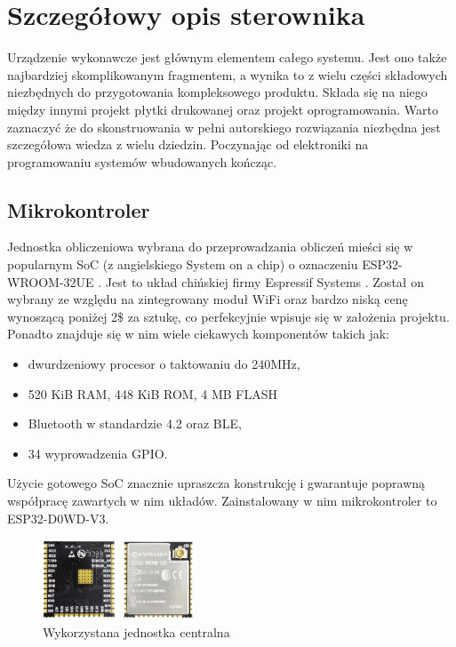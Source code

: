 
    \chapter{Szczegółowy opis sterownika}
        Urządzenie wykonawcze jest głównym elementem całego systemu. Jest ono także najbardziej skomplikowanym fragmentem, a wynika to z wielu części składowych niezbędnych do przygotowania kompleksowego produktu. Składa się na niego między innymi projekt płytki drukowanej oraz projekt oprogramowania. Warto zaznaczyć że do skonstruowania w pełni autorskiego rozwiązania niezbędna jest szczegółowa wiedza z wielu dziedzin. Poczynając od elektroniki na programowaniu systemów wbudowanych kończąc.
    
    
        \section{Mikrokontroler}
            Jednostka obliczeniowa wybrana do przeprowadzania obliczeń mieści się w popularnym SoC (z angielskiego System on a chip) o oznaczeniu ESP32-WROOM-32UE \cite{esp_module}. Jest to układ chińskiej firmy Espressif Systems \cite{espressif}. Został on wybrany ze względu na zintegrowany moduł WiFi oraz bardzo niską cenę wynoszącą poniżej 2\$ za sztukę, co perfekcyjnie wpisuje się w założenia projektu. Ponadto znajduje się w nim wiele ciekawych komponentów takich jak:
    
            \begin{itemize}
              \item dwurdzeniowy procesor o taktowaniu do 240MHz,
              \item 520 KiB RAM, 448 KiB ROM, 4 MB FLASH
              \item Bluetooth w standardzie 4.2 oraz BLE,
              \item 34 wyprowadzenia GPIO.
            \end{itemize}
            
            Użycie gotowego SoC znacznie upraszcza konstrukcję i gwarantuje poprawną współpracę zawartych w nim układów. Zainstalowany w nim mikrokontroler to ESP32-D0WD-V3. 
    
    
            \begin{figure}[ht]
              \centering
              \includegraphics[width=0.4\textwidth]{img/esp32.jpg}
              \caption{Wykorzystana jednostka centralna}
              \label{esp}
            \end{figure}
    
